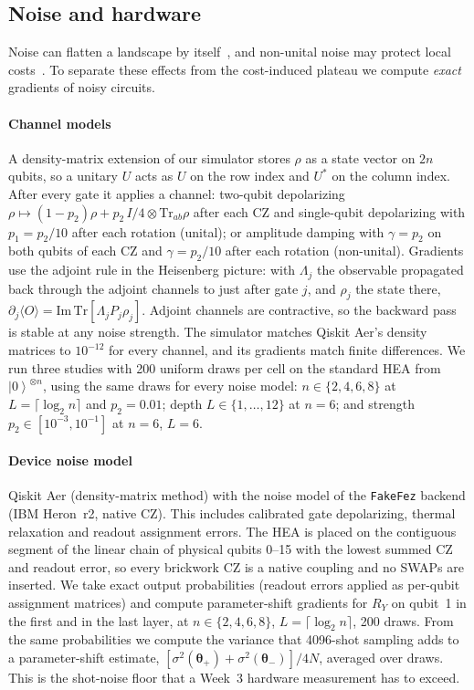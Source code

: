 \documentclass[conference]{IEEEtran}
\providecommand{\ket}[1]{\left|#1\right\rangle}
\begin{document}
\subsection{Noise and hardware}\label{sec:noise}
Noise can flatten a landscape by itself~\cite{wang2021,singkanipa2025}, and
non-unital noise may protect local costs~\cite{mele2026}. To separate these
effects from the cost-induced plateau we compute \emph{exact} gradients of
noisy circuits.

\paragraph*{Channel models} A density-matrix extension of our simulator
stores $\rho$ as a state vector on $2n$ qubits, so a unitary $U$ acts as $U$ on the row
index and $U^*$ on the column index. After every gate it applies a channel:
two-qubit depolarizing $\rho\mapsto(1-p_2)\rho+p_2\,I/4\otimes\mathrm{Tr}_{ab}\rho$
after each CZ and single-qubit depolarizing with $p_1=p_2/10$ after each
rotation (unital); or amplitude damping with $\gamma=p_2$ on both qubits of each
CZ and $\gamma=p_2/10$ after each rotation (non-unital). Gradients use the
adjoint rule in the Heisenberg picture: with $\Lambda_j$ the observable
propagated back through the adjoint channels to just after gate $j$, and
$\rho_j$ the state there, $\partial_j\langle O\rangle=\mathrm{Im}\,\mathrm{Tr}[\Lambda_jP_j\rho_j]$.
Adjoint channels are contractive, so the backward pass is stable at any
noise strength. The simulator matches Qiskit Aer's density matrices to
$10^{-12}$ for every channel, and its gradients match finite differences. We
run three studies with 200 uniform draws per cell on the standard HEA from
$\ket{0}^{\otimes n}$, using the same draws for every noise model:
$n\in\{2,4,6,8\}$ at $L=\lceil\log_2n\rceil$ and $p_2=0.01$; depth
$L\in\{1,\dots,12\}$ at $n=6$; and strength $p_2\in[10^{-3},10^{-1}]$ at
$n=6$, $L=6$.

\paragraph*{Device noise model} Qiskit Aer (density-matrix method) with the
noise model of the \texttt{FakeFez} backend (IBM Heron~r2, native CZ). This
includes calibrated gate depolarizing, thermal relaxation and readout assignment
errors. The HEA is placed on the contiguous segment of the linear chain of
physical qubits 0--15 with the lowest summed CZ and readout error, so every
brickwork CZ is a native coupling and no SWAPs are inserted. We take exact output
probabilities (readout errors applied as per-qubit assignment matrices) and
compute parameter-shift gradients for $R_Y$ on qubit~1 in the first and in the
last layer, at $n\in\{2,4,6,8\}$, $L=\lceil\log_2n\rceil$, 200 draws. From the
same probabilities we compute the variance that 4096-shot sampling adds to a
parameter-shift estimate, $[\sigma^2(\boldsymbol\theta_+)+\sigma^2(\boldsymbol\theta_-)]/4N$,
averaged over draws. This is the shot-noise floor that a Week~3 hardware
measurement has to exceed.
\end{document}
